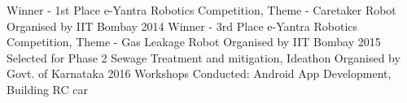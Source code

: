 \begin{cvhonors}
  \cvhonor
    {Winner - 1st Place}
    {e-Yantra Robotics Competition, Theme - Caretaker Robot}
    {Organised by IIT Bombay}
    {2014}
  \cvhonor
    {Winner - 3rd Place}
    {e-Yantra Robotics Competition, Theme - Gas Leakage Robot}
    {Organised by IIT Bombay}
    {2015}
  \cvhonor
    {Selected for Phase 2}
    {Sewage Treatment and mitigation, Ideathon}
    {Organised by Govt. of Karnataka }
    {2016}
    \cvhonor
    {Workshops Conducted:}
    {Android App Development, Building RC car}
    {}
    {}
\end{cvhonors}
